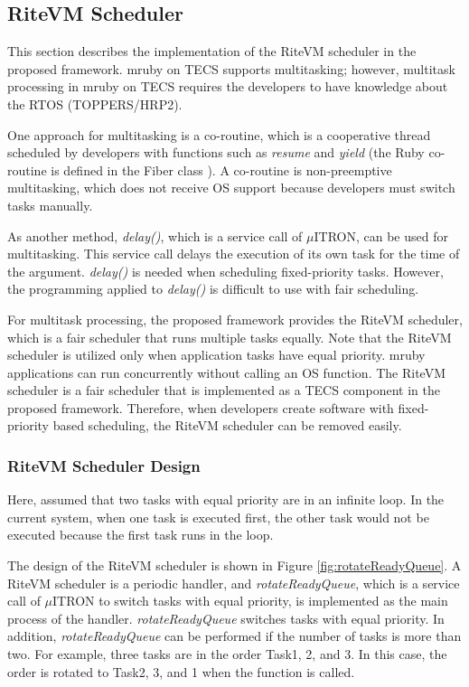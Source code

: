 \documentclass[conference]{IEEEtran/IEEEtran/IEEEtran}
\begin{document}
\subsection{RiteVM Scheduler}
\label{sec:RiteVM Scheduler}
This section describes the implementation of the RiteVM scheduler in the proposed framework.
mruby on TECS supports multitasking; however, multitask processing in mruby on TECS requires the developers to have knowledge about the RTOS (TOPPERS/HRP2).

One approach for multitasking is a co-routine, which is a cooperative thread scheduled by developers with functions such as {\it resume} and {\it yield} (the Ruby co-routine is defined in the Fiber class \cite{url:co-routine}).
A co-routine is non-preemptive multitasking, which does not receive OS support because developers must switch tasks manually.

As another method, {\it delay()}, which is a service call of $\mu$ITRON, can be used for multitasking.
This service call delays the execution of its own task for the time of the argument.
{\it delay()} is needed when scheduling fixed-priority tasks.
However, the programming applied to {\it delay()} is difficult to use with fair scheduling.

For multitask processing, the proposed framework provides the RiteVM scheduler, which is a fair scheduler that runs multiple tasks equally.
Note that the RiteVM scheduler is utilized only when application tasks have equal priority.
mruby applications can run concurrently without calling an OS function.
The RiteVM scheduler is a fair scheduler that is implemented as a TECS component in the proposed framework.
Therefore, when developers create software with fixed-priority based scheduling, the RiteVM scheduler can be removed easily.


\subsubsection{RiteVM Scheduler Design}
Here, assumed that two tasks with equal priority are in an infinite loop.
 In the current system, when one task is executed first, the other task would not be executed because the first task runs in the loop.

The design of the RiteVM scheduler is shown in Figure \ref{fig:rotateReadyQueue}. 
A RiteVM scheduler is a periodic handler, and {\it rotateReadyQueue}, which is a service call of $\mu$ITRON to switch tasks with equal priority, is implemented as the main process of the handler.
{\it rotateReadyQueue} switches tasks with equal priority.
In addition, {\it rotateReadyQueue} can be performed if the number of tasks is more than two.
For example, three tasks are in the order Task1, 2, and 3.
In this case, the order is rotated to Task2, 3, and 1 when the function is called.
\end{document}

